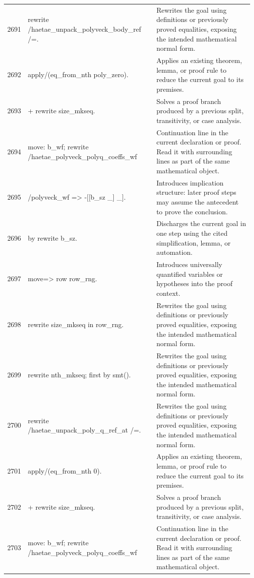 \documentclass[10pt]{article}
\begin{document}
\begin{longtable}{r L{0.53\textwidth} L{0.37\textwidth}}
2691 & {\ttfamily\scriptsize rewrite /haetae\_unpack\_polyveck\_body\_ref /=.} & Rewrites the goal using definitions or previously proved equalities, exposing the intended mathematical normal form. \\
2692 & {\ttfamily\scriptsize apply/(eq\_from\_nth poly\_zero).} & Applies an existing theorem, lemma, or proof rule to reduce the current goal to its premises. \\
2693 & {\ttfamily\scriptsize + rewrite size\_mkseq.} & Solves a proof branch produced by a previous split, transitivity, or case analysis. \\
2694 & {\ttfamily\scriptsize   move: b\_wf; rewrite /haetae\_polyveck\_polyq\_coeffs\_wf} & Continuation line in the current declaration or proof.  Read it with surrounding lines as part of the same mathematical object. \\
2695 & {\ttfamily\scriptsize                           /polyveck\_wf => -[[b\_sz \_] \_].} & Introduces implication structure: later proof steps may assume the antecedent to prove the conclusion. \\
2696 & {\ttfamily\scriptsize   by rewrite b\_sz.} & Discharges the current goal in one step using the cited simplification, lemma, or automation. \\
2697 & {\ttfamily\scriptsize move=> row row\_rng.} & Introduces universally quantified variables or hypotheses into the proof context. \\
2698 & {\ttfamily\scriptsize rewrite size\_mkseq in row\_rng.} & Rewrites the goal using definitions or previously proved equalities, exposing the intended mathematical normal form. \\
2699 & {\ttfamily\scriptsize rewrite nth\_mkseq; first by smt().} & Rewrites the goal using definitions or previously proved equalities, exposing the intended mathematical normal form. \\
2700 & {\ttfamily\scriptsize rewrite /haetae\_unpack\_poly\_q\_ref\_at /=.} & Rewrites the goal using definitions or previously proved equalities, exposing the intended mathematical normal form. \\
2701 & {\ttfamily\scriptsize apply/(eq\_from\_nth 0).} & Applies an existing theorem, lemma, or proof rule to reduce the current goal to its premises. \\
2702 & {\ttfamily\scriptsize + rewrite size\_mkseq.} & Solves a proof branch produced by a previous split, transitivity, or case analysis. \\
2703 & {\ttfamily\scriptsize   move: b\_wf; rewrite /haetae\_polyveck\_polyq\_coeffs\_wf} & Continuation line in the current declaration or proof.  Read it with surrounding lines as part of the same mathematical object. \\

\end{longtable}
\end{document}
